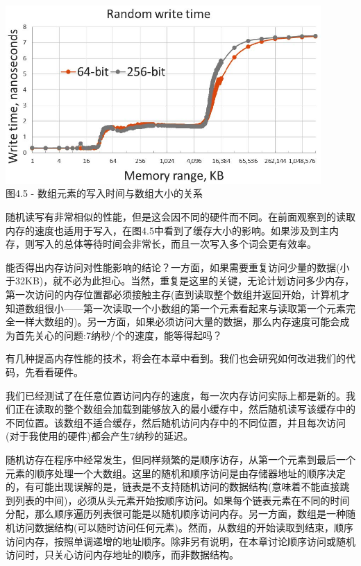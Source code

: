 \begin{center}
\includegraphics[width=0.9\textwidth]{content/1/chapter4/images/5.jpg}\\
图4.5 - 数组元素的写入时间与数组大小的关系
\end{center}

随机读写有非常相似的性能，但是这会因不同的硬件而不同。在前面观察到的读取内存的速度也适用于写入，在图4.5中看到了缓存大小的影响。如果涉及到主内存，则写入的总体等待时间会非常长，而且一次写入多个词会更有效率。

能否得出内存访问对性能影响的结论？一方面，如果需要重复访问少量的数据(小于32KB)，就不必为此担心。当然，重复是这里的关键，无论计划访问多少内存，第一次访问的内存位置都必须接触主存(直到读取整个数组并返回开始，计算机才知道数组很小——第一次读取一个小数组的第一个元素看起来与读取第一个元素完全一样大数组的)。另一方面，如果必须访问大量的数据，那么内存速度可能会成为首先关心的问题:7纳秒/个的速度，能等得起吗？

有几种提高内存性能的技术，将会在本章中看到。我们也会研究如何改进我们的代码，先看看硬件。


我们已经测试了在任意位置访问内存的速度，每一次内存访问实际上都是新的。我们正在读取的整个数组会加载到能够放入的最小缓存中，然后随机读写该缓存中的不同位置。该数组不适合缓存，然后随机访问内存中的不同位置，并且每次访问(对于我使用的硬件)都会产生7纳秒的延迟。

随机访存在程序中经常发生，但同样频繁的是顺序访存，从第一个元素到最后一个元素的顺序处理一个大数组。这里的随机和顺序访问是由存储器地址的顺序决定的，有可能出现误解的是，链表是不支持随机访问的数据结构(意味着不能直接跳到列表的中间)，必须从头元素开始按顺序访问。如果每个链表元素在不同的时间分配，那么顺序遍历列表很可能是以随机顺序访问内存。另一方面，数组是一种随机访问数据结构(可以随时访问任何元素)。然而，从数组的开始读取到结束，顺序访问内存，按照单调递增的地址顺序。除非另有说明，在本章讨论顺序访问或随机访问时，只关心访问内存地址的顺序，而非数据结构。

